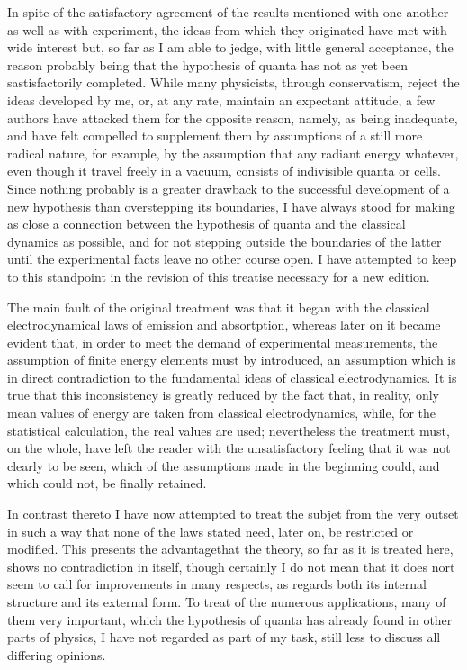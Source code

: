 \documentclass[12pt,oneside]{book}
\begin{document}
In spite of the satisfactory agreement of the results mentioned with one another as well as with experiment, the ideas from which they originated have met with wide interest but, so far as I am able to jedge, with little general acceptance, the reason probably being that the hypothesis of quanta has not as yet been sastisfactorily completed. While many physicists, through conservatism, reject the ideas developed by me, or, at any rate, maintain an expectant attitude, a few authors have attacked them for the opposite reason, namely, as being inadequate, and have felt compelled to supplement them by assumptions of a still more radical nature, for example, by the assumption that any radiant energy whatever, even though it travel freely in a vacuum, consists of indivisible quanta or cells. Since nothing probably is a greater drawback to the successful development of a new hypothesis than overstepping its boundaries, I have always stood for making as close a connection between the hypothesis of quanta and the classical dynamics as possible, and for not stepping outside the boundaries of the latter until the experimental facts leave no other course open. I have attempted to keep to this standpoint in the revision of this treatise necessary for a new edition. \par

The main fault of the original treatment was that it began with the classical electrodynamical laws of emission and absortption, whereas later on it became evident that, in order to meet the demand of experimental measurements, the assumption of finite energy elements must by introduced, an assumption which is in direct contradiction to the fundamental ideas of classical electrodynamics. It is true that this inconsistency is greatly reduced by the fact that, in reality, only mean values of energy are taken from classical electrodynamics, while, for the statistical calculation, the real values are used; nevertheless the treatment must, on the whole, have left the reader with the unsatisfactory feeling that it was not clearly to be seen, which of the assumptions made in the beginning could, and which could not, be finally retained. \par

In contrast thereto I have now attempted to treat the subjet from the very outset in such a way that none of the laws stated need, later on, be restricted or modified. This presents the advantagethat the theory, so far as it is treated here, shows no contradiction in itself, though certainly I do not mean that it does nort seem to call for improvements in many respects, as regards both its internal structure and its external form. To treat of the numerous applications, many of them very important, which the hypothesis of quanta has already found in other parts of physics, I have not regarded as part of my task, still less to discuss all differing opinions. \par
\end{document}
